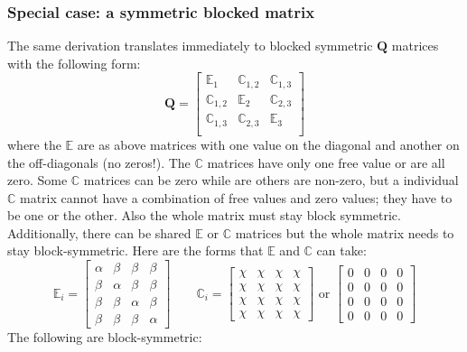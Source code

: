 \documentclass[]{article}
\def\QQ{\mbox{$\mathbf Q$}}	 \def\qq{\mbox{$\mathbf q$}} \def\Qb{\mbox{$\mathbf G$}}  \def\Qm{\mathbb{Q}}
\begin{document}
\subsubsection{Special case: a symmetric blocked matrix}
\label{sec:Q.symmetric blocked}
The same derivation translates immediately to blocked symmetric $\QQ$ matrices with the following form:
\begin{equation*}
\QQ=
\begin{bmatrix}
\mathbb{E}_1&\mathbb{C}_{1,2}&\mathbb{C}_{1,3}\\
\mathbb{C}_{1,2}&\mathbb{E}_2&\mathbb{C}_{2,3}\\
\mathbb{C}_{1,3}&\mathbb{C}_{2,3}&\mathbb{E}_3\\
\end{bmatrix}
\end{equation*}
where the $\mathbb{E}$ are as above matrices with one value on the diagonal and another on the off-diagonals (no zeros!). The $\mathbb{C}$ matrices have only one free value or are all zero.  Some $\mathbb{C}$ matrices can be zero while are others are non-zero, but a individual $\mathbb{C}$ matrix cannot have a combination of free values and zero values; they have to be one or the other. Also the whole matrix must stay block symmetric. Additionally, there can be shared $\mathbb{E}$ or $\mathbb{C}$ matrices but the whole matrix needs to stay block-symmetric.  Here are the forms that $\mathbb{E}$ and $\mathbb{C}$ can take:
\begin{equation*}
\mathbb{E}_i=
\begin{bmatrix}
\alpha&\beta&\beta&\beta\\
\beta&\alpha&\beta&\beta\\
\beta&\beta&\alpha&\beta\\
\beta&\beta&\beta&\alpha
\end{bmatrix}
\quad\quad
\mathbb{C}_i=
\begin{bmatrix}
\chi&\chi&\chi&\chi\\
\chi&\chi&\chi&\chi\\
\chi&\chi&\chi&\chi\\
\chi&\chi&\chi&\chi
\end{bmatrix}
\text{ or }
\begin{bmatrix}
0&0&0&0\\
0&0&0&0\\
0&0&0&0\\
0&0&0&0
\end{bmatrix}
\end{equation*}
The following are block-symmetric:
\end{document}
